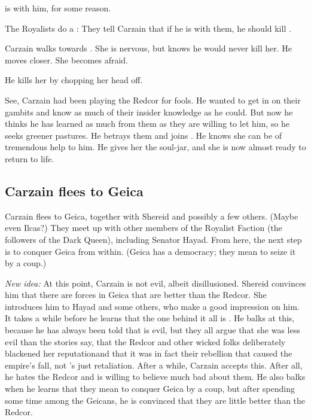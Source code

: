 \Racel{} is with him, for some reason. 

The Royalists do a : 
They tell Carzain that if he is with them, he should kill \Racel. 

Carzain walks towards \Racel. 
She is nervous, but knows he would never kill her.
He moves closer.
She becomes afraid.

He kills her by chopping her head off. 

See, Carzain had been playing the Redcor for fools. 
He wanted to get in on their gambits and know as much of their insider knowledge as he could. 
But now he thinks he has learned as much from them as they are willing to let him, so he seeks greener pastures. 
He betrays them and joins \Belzir. 
He knows she can be of tremendous help to him.
He gives her the soul-jar, and she is now almost ready to return to life. 







\subsection{Carzain flees to Geica} 
Carzain flees to Geica, together with Shereid and possibly a few others. 
(Maybe even Ilcas?) 
They meet up with other members of the Royalist Faction (the followers of the Dark Queen), including Senator Hayad. 
From here, the next step is to conquer Geica from within. 
(Geica has a democracy; they mean to seize it by a coup.) 

\emph{New idea:} 
At this point, Carzain is not evil, albeit disillusioned. 
Shereid convinces him that there are forces in Geica that are better than the Redcor. 
She introduces him to Hayad and some others, who make a good impression on him. 
It takes a while before he learns that the one behind it all is \Belzir. 
He balks at this, because he has always been told that \Belzir{} is evil, but they all argue that she was less evil than the stories say, that the Redcor and other wicked folks deliberately blackened her reputation\dash and that it was in fact their rebellion that caused the empire's fall, not \Belzir's just retaliation. 
After a while, Carzain accepts this. 
After all, he hates the Redcor and is willing to believe much bad about them. 
He also balks when he learns that they mean to conquer Geica by a coup, but after spending some time among the Geicans, he is convinced that they are little better than the Redcor. 







